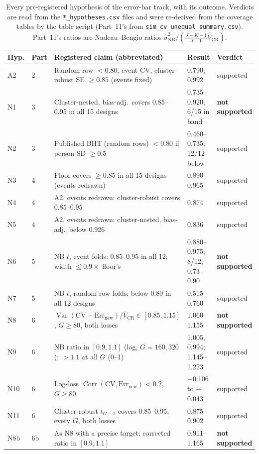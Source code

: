 \documentclass[11pt]{amsart}
\theoremstyle{plain}
\theoremstyle{definition}
\theoremstyle{remark}
\newcommand{\VCR}{\hat V_{\mathrm{CR}}}
\newcommand{\VNB}{\hat\sigma^2_{\mathrm{NB}}}
\newcommand{\fac}{\tfrac{J+K-1}{J-1}}
\begin{document}
\begin{table}[tbp]
\centering\footnotesize
\caption{Every pre-registered hypothesis of the error-bar track, with its outcome. Verdicts are read from the \texttt{*\_hypotheses.csv} files and were re-derived from the coverage tables by the table script (Part~11's from \texttt{sim\_cv\_unequal\_summary.csv}). Part~11's ratios are Nadeau--Bengio ratios $\VNB/(\fac\VCR)$.}\label{tab:verdicts}
\begin{tabular}{@{}l l p{8.1cm} p{4.0cm} l@{}}
\toprule
Hyp. & Part & Registered claim (abbreviated) & Result & Verdict\\
\midrule
A2 & 2 & Random-row $<0.80$; event CV, cluster-robust SE $\ge 0.85$ (events fixed) & 0.790; 0.992 & supported \\
N1 & 3 & Cluster-nested, bias-adj.\ covers 0.85--0.95 in all 15 designs & 0.735--0.920; 6/15 in band & \textbf{not supported} \\
N2 & 3 & Published BHT (random rows) $<0.80$ if person SD $\ge 0.5$ & 0.460--0.735; 12/12 below & supported \\
N3 & 4 & Floor covers $\ge 0.85$ in all 15 designs (events redrawn) & 0.890--0.965 & supported \\
N4 & 4 & A2, events redrawn: cluster-robust covers 0.85--0.95 & 0.874 & supported \\
N5 & 4 & A2, events redrawn: cluster-nested, bias-adj.\ below 0.926 & 0.836 & supported \\
N6 & 5 & NB $t$, event folds: 0.85--0.95 in all 12; width $\le 0.9\times$ floor's & 0.880--0.975; 8/12; 0.73--0.90 & \textbf{not supported} \\
N7 & 5 & NB $t$, random-row folds: below 0.80 in all 12 designs & 0.515--0.760 & supported \\
N8 & 6 & $\operatorname{Var}(\mathrm{CV}-\mathrm{Err}_{\mathrm{new}})/\overline{V}_{\mathrm{CR}}\in[0.85,1.15]$, $G\ge 80$, both losses & 1.060--1.155 & \textbf{not supported} \\
N9 & 6 & NB ratio in $[0.9,1.1]$ (log, $G=160,320$); $>1.1$ at all $G$ (0--1) & 1.005, 0.994; 1.145--1.223 & supported \\
N10 & 6 & Log-loss $\operatorname{Corr}(\mathrm{CV},\mathrm{Err}_{\mathrm{new}})<0.2$, $G\ge 80$ & $-$0.106 to $-$0.043 & supported \\
N11 & 6 & Cluster-robust $t_{G-1}$ covers 0.85--0.95, every $G$, both losses & 0.875--0.902 & supported \\
N8b & 6b & As N8 with a precise target; corrected ratio in $[0.9,1.1]$ & 0.911--1.165 & \textbf{not supported} \\

\end{tabular}
\end{table}
\end{document}
